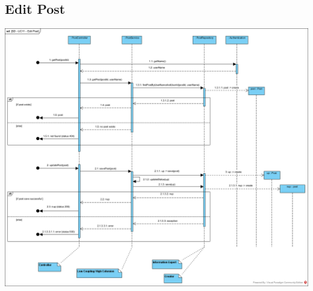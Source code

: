 \documentclass{article}
\begin{document}
\subsection{Edit Post}
        \includegraphics[scale=0.5]{images/SD-UC11-EditPost.png}
        \label{fig:SD-EditPost}
\end{document}
